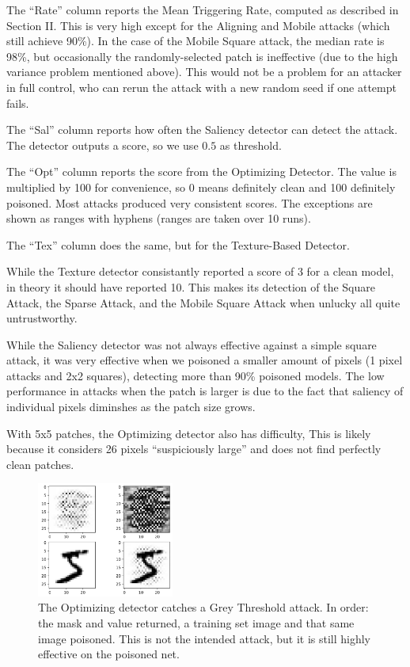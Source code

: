 \documentclass[letterpaper, 10 pt, conference]{ieeeconf}  %
\begin{document}
The ``Rate'' column reports the Mean Triggering Rate, computed as described
in Section II.  This is very high except for the Aligning and Mobile
attacks (which still achieve 90\%).  In the case of the Mobile Square
attack, the median rate is 98\%, but occasionally the
randomly-selected patch is ineffective (due to the high variance problem
mentioned above).  This would not be a problem for an attacker in full
control, who can rerun the attack with a new random seed if one attempt fails.

The ``Sal'' column reports how often the Saliency detector can
detect the attack.  The detector outputs a score, so we use $0.5$ as threshold.

The ``Opt'' column reports the score from the Optimizing
Detector.  The value is multiplied by 100 for convenience, so 0 means
definitely clean and 100 definitely poisoned.  Most attacks produced
very consistent scores.  The exceptions are shown as ranges with
hyphens (ranges are taken over 10 runs).

The ``Tex'' column does the same, but for the Texture-Based
Detector.

While the Texture detector consistantly reported a score of 3 for a
clean model, in theory it should have reported 10.  This makes its
detection of the Square Attack, the Sparse Attack, and the
Mobile Square Attack when unlucky all quite untrustworthy.

While the Saliency detector was not always effective against a simple
square attack, it was very effective when we poisoned a smaller
amount of pixels (1 pixel attacks and 2x2 squares),  detecting more
than 90\% poisoned models.  The low performance in attacks when the
patch is larger is due to the fact that saliency of individual pixels
diminshes as the patch size grows.

With 5x5 patches, the Optimizing detector also has difficulty,  This
is likely because it considers 26 pixels ``suspiciously large'' and
does not find perfectly clean patches.

\begin{figure}[b]
\centering
\includegraphics[width=0.4\textwidth]{catch_grey.png}
\caption{The Optimizing detector catches a Grey Threshold attack.  In
  order: the mask and value returned, a training set image and that
  same image poisoned.  This is not the intended attack, but it is
  still highly effective on the poisoned net.}
\label{catchgrey}
\end{figure}
\end{document}
